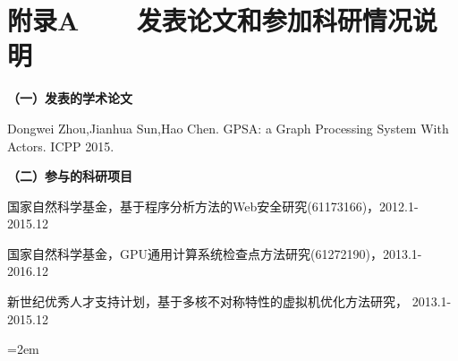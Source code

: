 
\chapter*{附录A~~~~发表论文和参加科研情况说明}
\setlength{\parindent}{0em}
\textbf{（一）发表的学术论文}
\begin{publist}
	\item Dongwei Zhou,Jianhua Sun,Hao Chen. GPSA: a Graph Processing System With Actors. ICPP 2015.
\end{publist}

\vspace*{1em}

\textbf{（二）参与的科研项目}
\begin{publist}
\item 国家自然科学基金，基于程序分析方法的Web安全研究(61173166)，2012.1-2015.12

\item 国家自然科学基金，GPU通用计算系统检查点方法研究(61272190)，2013.1-2016.12

\item 新世纪优秀人才支持计划，基于多核不对称特性的虚拟机优化方法研究， 2013.1-2015.12
\end{publist}
\vfill
{}\hangindent=2em\noindent

\setlength{\parindent}{2em}

